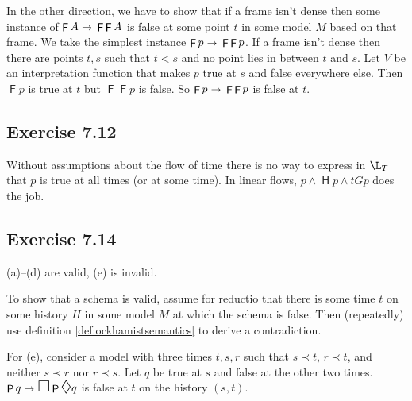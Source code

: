 \documentclass{scrartcl}
\let\oldbox\Box
\renewcommand\Box{\scaleobj{1.2}{\oldbox}}
\let\olddiamond\Diamond
\renewcommand\Diamond{\scaleobj{1.2}{\olddiamond}}
\let\oldto\to
\renewcommand\to{\scaleobj{0.95}{\,\oldto\,}}
\DeclareMathOperator{\tP}{\mathsf{P}}
\DeclareMathOperator{\tF}{\mathsf{F}}
\DeclareMathOperator{\tH}{\mathsf{H}}
\begin{document}
  In the other direction, we have to show that if a frame isn't dense then some
  instance of $\tF A \to \tF\tF A$ is false at some point $t$ in some model $M$
  based on that frame. We take the simplest instance $\tF p \to \tF\tF p$. If a
  frame isn't dense then there are points $t,s$ such that $t<s$ and no point
  lies in between $t$ and $s$. Let $V$ be an interpretation function that makes
  $p$ true at $s$ and false everywhere else. Then $\tF p$ is true at $t$ but
  $\tF\tF p$ is false. So $\tF p \to \tF\tF p$ is false at $t$.

  \subsection*{Exercise 7.12}

%
%
  Without assumptions about the flow of time there is no way to express in
  $\L_T$ that $p$ is true at all times (or at some time). In linear flows,
  $p \land \tH p \land tG p$ does the job.

  \subsection*{Exercise 7.14}

%
%
  (a)--(d) are valid, (e) is invalid.

  To show that a schema is valid, assume for reductio that there is some time
  $t$ on some history $H$ in some model $M$ at which the schema is false. Then
  (repeatedly) use definition \ref{def:ockhamistsemantics} to derive a
  contradiction.

  For (e), consider a model with three times $t,s,r$ such that $s\prec t$,
  $r\prec t$, and neither $s \prec r$ nor $r\prec s$. Let $q$ be true at $s$ and
  false at the other two times. $\tP q \to \Box \tP \Diamond q$ is false at $t$
  on the history $(s,t)$.
\end{document}
